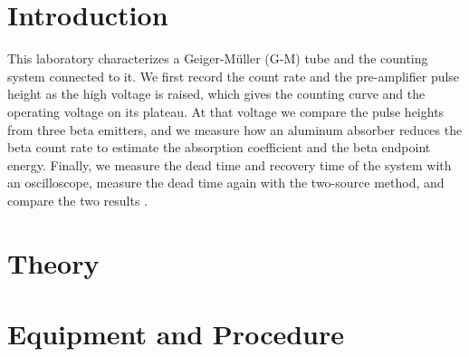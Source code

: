 \documentclass[12pt]{article}
\begin{document}
\tableofcontents

\newpage

\begin{abstract}

{}


\end{abstract}


\section{Introduction}

This laboratory characterizes a Geiger-M\"uller (G-M) tube and the counting system connected to it. We first record the count rate and the pre-amplifier pulse height as the high voltage is raised, which gives the counting curve and the operating voltage on its plateau. At that voltage we compare the pulse heights from three beta emitters, and we measure how an aluminum absorber reduces the beta count rate to estimate the absorption coefficient and the beta endpoint energy. Finally, we measure the dead time and recovery time of the system with an oscilloscope, measure the dead time again with the two-source method, and compare the two results \cite{labmanual}.




\section{Theory}




\section{Equipment and Procedure}
\end{document}
